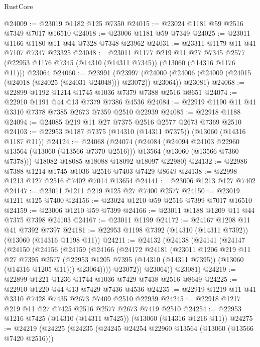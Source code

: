 \begin{lexlean}{RustCore}
\begin{coremodule}
@24009 := @23019 @1182 @125 @7350
@24015 := @23024 @1181 @59 @2516 @7349 @7017 @16510
@24018 := @23006 @1181 @59 @7349
@24025 := @23011 @1166 @1180 @11 @44 @7328 @7348 @23962
@24031 := @23311 @1179 @11 @41 @7107 @7347 @23325
@24048 := @23011
    @1177
    @219
    @11
    @27
    @7345
    @2577
    (@22953 @1176 @7345 (@14310 (@14311 @7345)) (@13060 (@14316 @1176 @11)))
    @23064
@24060 := @23991
    (@23997
      (@24000 (@24006 (@24009 (@24015 (@24018 (@24025 (@24031 @24048))) @23072)) @23064))
      @23081)
@24068 := @22899 @1192 @1214 @1745 @1036 @7379 @7388 @2516 @8651
@24074 := @22910 @1191 @44 @13 @7379 @7386 @4536
@24084 := @22919 @1190 @11 @41 @3310 @7378 @7385 @2673 @7359 @2510 @22939
@24085 := @22918 @1188
@24094 := @24085 @219 @11 @27 @7375 @2516 @2577 @2673 @7369 @2510
@24103 := @22953 @1187 @7375 (@14310 (@14311 @7375)) (@13060 (@14316 @1187 @11))
@24124 := @24068
    (@24074
      (@24084
        (@24094 @24103 @22960 @13564 (@13060 (@13566 @7370 @2516)))
        @13564
        (@13060 (@13566 @7360 @7378)))
      @18082
      @18085
      @18088
      @18092
      @18097
      @22980)
@24132 := @22986 @7388 @1214 @1745 @1036 @2516 @7403 @7429 @8649
@24138 := @22998 @1213 @127 @2516 @7402 @7014 @13654
@24141 := @23006 @1213 @127 @7402
@24147 := @23011 @1211 @219 @125 @27 @7400 @2577
@24150 := @23019 @1211 @125 @7400
@24156 := @23024 @1210 @59 @2516 @7399 @7017 @16510
@24159 := @23006 @1210 @59 @7399
@24166 := @23011 @1188 @1209 @11 @44 @7375 @7398 @24103
@24167 := @23011 @1199
@24172 := @24167 @1208 @11 @41 @7392 @7397
@24181 := @22953 @1198 @7392 (@14310 (@14311 @7392)) (@13060 (@14316 @1198 @11))
@24211 := @24132
    (@24138
      (@24141
        (@24147
          (@24150
            (@24156
              (@24159
                (@24166
                  (@24172
                    @24181
                    (@23011
                      @1206
                      @219
                      @11
                      @27
                      @7395
                      @2577
                      (@22953 @1205 @7395 (@14310 (@14311 @7395)) (@13060 (@14316 @1205 @11)))
                      @23064))))
              @23072))
          @23064))
      @23081)
@24219 := @22899 @1221 @1236 @1744 @1036 @7429 @7438 @2516 @8649
@24225 := @22910 @1220 @44 @13 @7429 @7436 @4536
@24235 := @22919 @1219 @11 @41 @3310 @7428 @7435 @2673 @7409 @2510 @22939
@24245 := @22918 @1217 @219 @11 @27 @7425 @2516 @2577 @2673 @7419 @2510
@24254 := @22953 @1216 @7425 (@14310 (@14311 @7425)) (@13060 (@14316 @1216 @11))
@24275 := @24219
    (@24225
      (@24235
        (@24245 @24254 @22960 @13564 (@13060 (@13566 @7420 @2516)))

\end{coremodule}
\end{lexlean}

